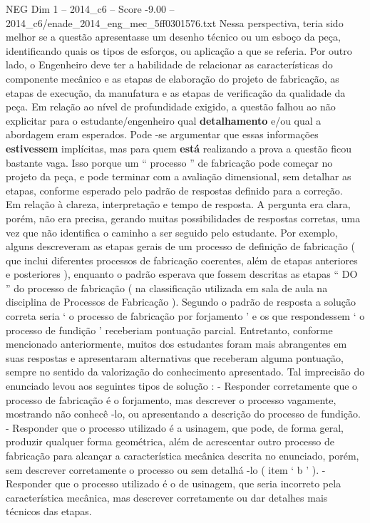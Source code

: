 \begin{textsample}{NEG Dim 1 – 2014\_c6 – Score -9.00 – 2014\_c6/enade\_2014\_eng\_mec\_5ff0301576.txt}
Nessa perspectiva, teria sido melhor se a questão apresentasse um desenho técnico ou um esboço da peça, identificando quais os tipos de esforços, ou aplicação a que se referia.
Por outro lado, o Engenheiro deve ter a habilidade de relacionar as características do componente mecânico e as etapas de elaboração do projeto de fabricação, as etapas de execução, da manufatura e as etapas de verificação da qualidade da peça.
Em relação ao nível de profundidade exigido, a questão falhou ao não explicitar para o estudante/engenheiro qual \textbf{detalhamento} e/ou qual a abordagem eram esperados.
Pode -se argumentar que essas informações \textbf{estivessem} implícitas, mas para quem \textbf{está} realizando a prova a questão ficou bastante vaga.
Isso porque um “ processo ” de fabricação pode começar no projeto da peça, e pode terminar com a avaliação dimensional, sem detalhar as etapas, conforme esperado pelo padrão de respostas definido para a correção.  Em relação à clareza, interpretação e tempo de resposta.
A pergunta era clara, porém, não era precisa, gerando muitas possibilidades de respostas corretas, uma vez que não identifica o caminho a ser seguido pelo estudante.
Por exemplo, alguns descreveram as etapas gerais de um processo de definição de fabricação ( que inclui diferentes processos de fabricação coerentes, além de etapas anteriores e posteriores ), enquanto o padrão esperava que fossem descritas as etapas “ DO ” do processo de fabricação ( na classificação utilizada em sala de aula na disciplina de Processos de Fabricação ).
Segundo o padrão de resposta a solução correta seria ‘ o processo de fabricação por forjamento ’ e os que respondessem ‘ o processo de fundição ’ receberiam pontuação parcial.
Entretanto, conforme mencionado anteriormente, muitos dos estudantes foram mais abrangentes em suas respostas e apresentaram alternativas que receberam alguma pontuação, sempre no sentido da valorização do conhecimento apresentado.
Tal imprecisão do enunciado levou aos seguintes tipos de solução : - Responder corretamente que o processo de fabricação é o forjamento, mas descrever o processo vagamente, mostrando não conhecê -lo, ou apresentando a descrição do processo de fundição. - Responder que o processo utilizado é a usinagem, que pode, de forma geral, produzir qualquer forma geométrica, além de acrescentar outro processo de fabricação para alcançar a característica mecânica descrita no enunciado, porém, sem descrever corretamente o processo ou sem detalhá -lo ( item ‘ b ’ ). - Responder que o processo utilizado é o de usinagem, que seria incorreto pela característica mecânica, mas descrever corretamente ou dar detalhes mais técnicos das etapas.

\end{textsample}

